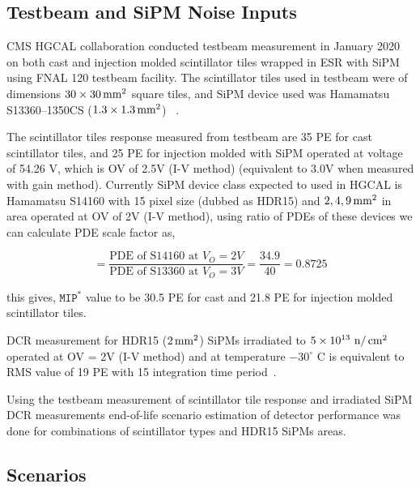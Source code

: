 \subsection{
  Testbeam and SiPM Noise Inputs
}

\gls{CMS} \gls{HGCAL} collaboration conducted testbeam measurement in January 2020 on both cast and injection
molded scintillator tiles wrapped in \gls{ESR} with \gls{SiPM}
using \gls{FNAL} 120 \GeV{} testbeam facility. The scintillator tiles
used in testbeam were of dimensions \( 30 \times 30 \,\text{mm}{}^{2} \) square tiles,
and \gls{SiPM} device used was Hamamatsu S13360--1350CS (\( 1.3 \times 1.3 \,\text{mm}{}^{2} \))
~\cite{mppc-13360,testbeam-fnal-2020}.

The scintillator tiles response measured from testbeam are 35 \gls{PE} for cast scintillator tiles,
and 25 \gls{PE} for injection molded with \gls{SiPM} operated at
voltage of 54.26 V, which is \gls{OV} of 2.5V (I-V method) (equivalent
to 3.0V when measured with gain method).
Currently \gls{SiPM} device class expected to used in \gls{HGCAL}
is Hamamatsu S14160 with 15\micron{} pixel size (dubbed as HDR15)
and \(2, 4, 9 \,\text{mm}{}^{2} \) in
area operated at \gls{OV} of 2V (I-V method),
using ratio of \glspl{PDE} of these devices
we can calculate PDE scale factor as,

\begin{equation}
  = \frac{\text{PDE of S14160 at } V_O = 2V}
  {\text{PDE of S13360 at } V_O = 3V}
  = \frac{34.9}{40}
  = 0.8725
\end{equation}

this gives, \( \texttt{MIP}^{*} \) value to be 30.5 \gls{PE} for cast
and 21.8 \gls{PE} for injection molded scintillator tiles.

\gls{DCR} measurement for HDR15 (\( 2 \,\text{mm}{}^2 \)) \glspl{SiPM}
irradiated to \( 5 \times {10}^{13} \text{ n}/\,\text{cm}{}^2 \)
operated at \gls{OV} = 2V (I-V method) and at temperature \( -30^{\circ} \text{ C}\)
is equivalent to \gls{RMS} value of 19 \gls{PE} with 15 \nanoseconds{} integration time
period~\cite{dark-current-measurement}.

Using the testbeam measurement of scintillator tile response and irradiated \gls{SiPM}
\gls{DCR} measurements end-of-life scenario estimation of
detector performance was done for combinations
of scintillator types and HDR15 \glspl{SiPM} areas.

\subsection{
  Scenarios
}

